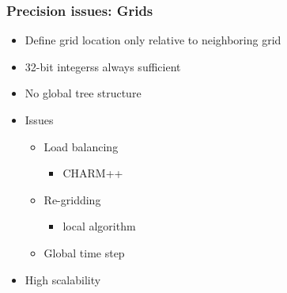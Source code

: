     \begin{frame}[fragile] \frametitle{Precision issues: Grids}
      \begin{itemize}
        \item Define grid location only relative to neighboring grid
        \item 32-bit integerss always sufficient
        \item No global tree structure
        \item Issues
        \begin{itemize}
          \item Load balancing
          \begin{itemize}
            \item CHARM++
          \end{itemize}
          \item Re-gridding
          \begin{itemize}
            \item local algorithm
          \end{itemize}
          \item Global time step
        \end{itemize}
        \item High scalability
      \end{itemize}
\end{frame}
